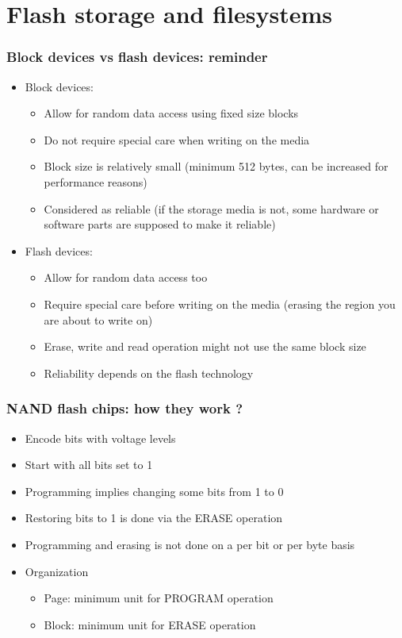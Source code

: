 \section{Flash storage and filesystems}

\begin{frame}
  \frametitle{Block devices vs flash devices: reminder}
  \begin{itemize}
  \item Block devices:
    \begin{itemize}
    \item Allow for random data access using fixed size blocks
    \item Do not require special care when writing on the media
    \item Block size is relatively small (minimum 512 bytes, can be
      increased for performance reasons)
    \item Considered as reliable (if the storage media is not, some
      hardware or software parts are supposed to make it reliable)
    \end{itemize}
  \item Flash devices:
    \begin{itemize}
    \item Allow for random data access too
    \item Require special care before writing on the media (erasing
      the region you are about to write on)
    \item Erase, write and read operation might not use the same block
      size
    \item Reliability depends on the flash technology
    \end{itemize}
  \end{itemize}
\end{frame}

\begin{frame}
  \frametitle{NAND flash chips: how they work ?}
  \begin{itemize}
  \item Encode bits with voltage levels
  \item Start with all bits set to 1
  \item Programming implies changing some bits from 1 to 0
  \item Restoring bits to 1 is done via the ERASE operation
  \item Programming and erasing is not done on a per bit or per byte
    basis
  \item Organization
    \begin{itemize}
    \item Page: minimum unit for PROGRAM operation
    \item Block: minimum unit for ERASE operation
    \end{itemize}
  \end{itemize}
\end{frame}


